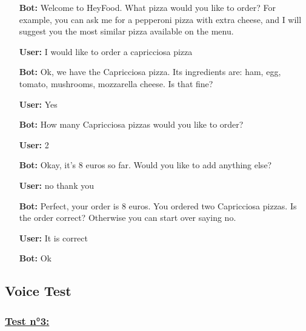 \begin{itemize}

\item[\textbf{Bot:}] Welcome to HeyFood.
What pizza would you like to order? For example, you can ask me for a pepperoni pizza with extra cheese, and I will suggest you the most similar pizza available on the menu.


\item[\textbf{User:}] I would like to order a capricciosa pizza

\item[\textbf{Bot:}] Ok, we have the Capricciosa pizza. Its ingredients are: ham, egg, tomato, mushrooms, mozzarella cheese. Is that fine?

\item[\textbf{User:}] Yes

\item[\textbf{Bot:}]How many Capricciosa pizzas would you like to order?

\item[\textbf{User:}] 2

\item[\textbf{Bot:}] Okay, it’s 8 euros so far. Would you like to add anything else?

\item[\textbf{User:}]no thank you

\item[\textbf{Bot:}] Perfect, your order is 8 euros. You ordered  two Capricciosa pizzas. Is the order correct? Otherwise you can start over saying no.


\item[\textbf{User:}] It is correct

\item[\textbf{Bot:}] Ok

\end{itemize}


\newpage

\subsection{Voice Test}

\subsubsection*{\underline{Test n°3:} }

